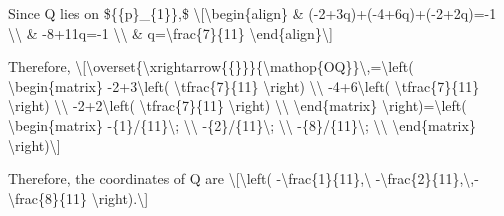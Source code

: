 Since Q lies on \$\{\{p\}\_\{1\}\},\$ \textbackslash{[}\textbackslash begin\{align\}
\& (-2+3q)+(-4+6q)+(-2+2q)=-1 \textbackslash\textbackslash{} \&
-8+11q=-1 \textbackslash\textbackslash{} \& q=\textbackslash frac\{7\}\{11\}
\textbackslash end\{align\}\textbackslash{]}

Therefore, \textbackslash{[}\textbackslash overset\{\textbackslash xrightarrow\{\{\}\}\}\{\textbackslash mathop\{OQ\}\}\textbackslash ,=\textbackslash left(
\textbackslash begin\{matrix\} -2+3\textbackslash left( \textbackslash tfrac\{7\}\{11\}
\textbackslash right) \textbackslash\textbackslash{} -4+6\textbackslash left(
\textbackslash tfrac\{7\}\{11\} \textbackslash right) \textbackslash\textbackslash{}
-2+2\textbackslash left( \textbackslash tfrac\{7\}\{11\} \textbackslash right)
\textbackslash\textbackslash{} \textbackslash end\{matrix\} \textbackslash right)=\textbackslash left(
\textbackslash begin\{matrix\} -\{1\}/\{11\}\textbackslash ; \textbackslash\textbackslash{}
-\{2\}/\{11\}\textbackslash ; \textbackslash\textbackslash{} -\{8\}/\{11\}\textbackslash ;
\textbackslash\textbackslash{} \textbackslash end\{matrix\} \textbackslash right)\textbackslash{]}

Therefore, the coordinates of Q are \textbackslash{[}\textbackslash left(
-\textbackslash frac\{1\}\{11\},\textbackslash{} -\textbackslash frac\{2\}\{11\},\textbackslash ,-\textbackslash frac\{8\}\{11\}
\textbackslash right).\textbackslash{]} 

